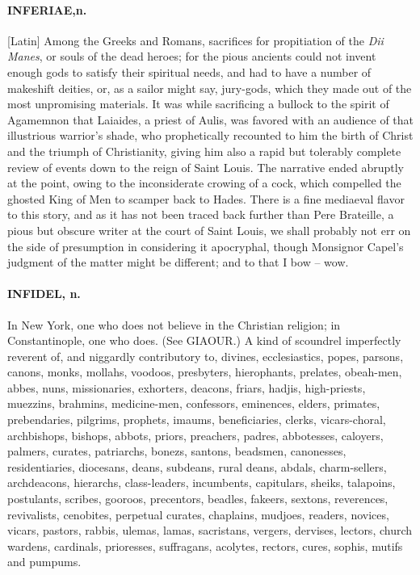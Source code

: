 \documentclass[11pt]{article}
\begin{document}
\paragraph{INFERIAE,n.}  [Latin]  Among the Greeks and Romans, sacrifices for
propitiation of the {\em Dii Manes}, or souls of the dead heroes; for the
pious ancients could not invent enough gods to satisfy their spiritual
needs, and had to have a number of makeshift deities, or, as a sailor
might say, jury-gods, which they made out of the most unpromising
materials.  It was while sacrificing a bullock to the spirit of
Agamemnon that Laiaides, a priest of Aulis, was favored with an
audience of that illustrious warrior's shade, who prophetically
recounted to him the birth of Christ and the triumph of Christianity,
giving him also a rapid but tolerably complete review of events down
to the reign of Saint Louis.  The narrative ended abruptly at the
point, owing to the inconsiderate crowing of a cock, which compelled
the ghosted King of Men to scamper back to Hades.  There is a fine
mediaeval flavor to this story, and as it has not been traced back
further than Pere Brateille, a pious but obscure writer at the court
of Saint Louis, we shall probably not err on the side of presumption
in considering it apocryphal, though Monsignor Capel's judgment of the
matter might be different; and to that I bow -- wow.

\paragraph{INFIDEL, n.}  In New York, one who does not believe in the Christian
religion; in Constantinople, one who does.  (See GIAOUR.)  A kind of
scoundrel imperfectly reverent of, and niggardly contributory to,
divines, ecclesiastics, popes, parsons, canons, monks, mollahs,
voodoos, presbyters, hierophants, prelates, obeah-men, abbes, nuns,
missionaries, exhorters, deacons, friars, hadjis, high-priests,
muezzins, brahmins, medicine-men, confessors, eminences, elders,
primates, prebendaries, pilgrims, prophets, imaums, beneficiaries,
clerks, vicars-choral, archbishops, bishops, abbots, priors,
preachers, padres, abbotesses, caloyers, palmers, curates, patriarchs,
bonezs, santons, beadsmen, canonesses, residentiaries, diocesans,
deans, subdeans, rural deans, abdals, charm-sellers, archdeacons,
hierarchs, class-leaders, incumbents, capitulars, sheiks, talapoins,
postulants, scribes, gooroos, precentors, beadles, fakeers, sextons,
reverences, revivalists, cenobites, perpetual curates, chaplains,
mudjoes, readers, novices, vicars, pastors, rabbis, ulemas, lamas,
sacristans, vergers, dervises, lectors, church wardens, cardinals,
prioresses, suffragans, acolytes, rectors, cures, sophis, mutifs and
pumpums.
\end{document}
